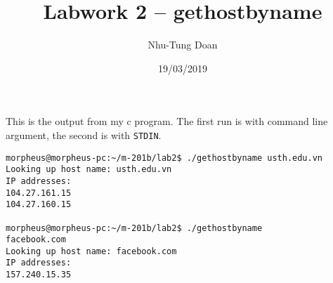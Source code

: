 \documentclass[12pt]{article}
\title{Labwork 2 -- gethostbyname}
\author{Nhu-Tung Doan}
\date{19/03/2019}
\begin{document}
\maketitle

This is the output from my c program. The first run is with command line argument, the second is with \texttt{STDIN}.

\begin{verbatim}
morpheus@morpheus-pc:~/m-201b/lab2$ ./gethostbyname usth.edu.vn
Looking up host name: usth.edu.vn
IP addresses:
104.27.161.15
104.27.160.15

morpheus@morpheus-pc:~/m-201b/lab2$ ./gethostbyname
facebook.com
Looking up host name: facebook.com
IP addresses:
157.240.15.35
\end{verbatim}
\end{document}
